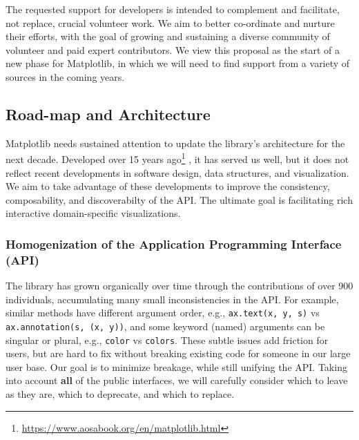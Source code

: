 \documentclass[11pt,letterpaper]{article}  %
\begin{document}
The requested support for developers is intended to complement and
facilitate, not replace, crucial volunteer work. We aim to better
co-ordinate and nurture their efforts, with the goal of growing and
sustaining a diverse community of volunteer and paid expert
contributors.  We view this proposal as the start of a new phase for
Matplotlib, in which we will need to find support from a variety of
sources in the coming years.



\subsection{Road-map and Architecture}

Matplotlib needs sustained attention to update the library's
architecture for the next decade.  Developed over 15 years
ago\footnote{\url{https://www.aosabook.org/en/matplotlib.html}}
\cite{Hunter:2007}, it has served us well, but it does not reflect
recent developments in software design, data structures, and
visualization. We aim to take advantage of these developments to
improve the consistency, composability, and discoverabilty of the
API. The ultimate goal is facilitating rich interactive
domain-specific visualizations.



\subsubsection{Homogenization of the Application Programming Interface (API)}
\label{sec:api_hom}
The library has grown organically over time through the contributions of over 900 individuals, accumulating many small inconsistencies in the API. For example, similar methods have different
argument order, e.g., \texttt{ax.text(x, y, s)} vs
\texttt{ax.annotation(s, (x, y))}, and some keyword (named) arguments can be
singular or plural, e.g., \texttt{color} vs \texttt{colors}.  These
subtle issues add friction for users, but are hard to fix without
breaking existing code for someone in our large user base.  Our goal is
to minimize breakage, while still unifying the API. Taking into account
\textbf{all} of the public interfaces, we will carefully consider which to leave as
they are, which to deprecate, and which to replace.
\end{document}
